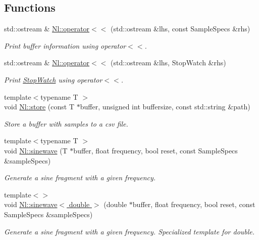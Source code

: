 \subsection*{Functions}
\begin{DoxyCompactItemize}
\item 
std\-::ostream \& \hyperlink{group__Tools_ga21ced8b76270aede19373d40b3c7152e}{Nl\-::operator$<$$<$} (std\-::ostream \&lhs, const Sample\-Specs \&rhs)
\begin{DoxyCompactList}\small\item\em Print buffer information using operator$<$$<$. \end{DoxyCompactList}\item 
std\-::ostream \& \hyperlink{group__Tools_gab42f6e06b29fcac2cb1a892ee4de7553}{Nl\-::operator$<$$<$} (std\-::ostream \&lhs, Stop\-Watch \&rhs)
\begin{DoxyCompactList}\small\item\em Print \hyperlink{classNl_1_1StopWatch}{Stop\-Watch} using operator$<$$<$. \end{DoxyCompactList}\item 
{\footnotesize template$<$typename T $>$ }\\void \hyperlink{group__Tools_gadb18f37b41d4edd77ff13d13f0311e77}{Nl\-::store} (const T $\ast$buffer, unsigned int buffersize, const std\-::string \&path)
\begin{DoxyCompactList}\small\item\em Store a buffer with samples to a csv file. \end{DoxyCompactList}\item 
{\footnotesize template$<$typename T $>$ }\\void \hyperlink{group__Tools_gad99e898829b8d45b58f204aeef02dda0}{Nl\-::sinewave} (T $\ast$buffer, float frequency, bool reset, const Sample\-Specs \&sample\-Specs)
\begin{DoxyCompactList}\small\item\em Generate a sine fragment with a given frequency. \end{DoxyCompactList}\item 
{\footnotesize template$<$$>$ }\\void \hyperlink{group__Tools_ga4225b04a5644b2bdab0448998e75dd81}{Nl\-::sinewave$<$ double $>$} (double $\ast$buffer, float frequency, bool reset, const Sample\-Specs \&sample\-Specs)
\begin{DoxyCompactList}\small\item\em Generate a sine fragment with a given frequency. Specialized template for double. \end{DoxyCompactList}\item 

\end{DoxyCompactItemize}
